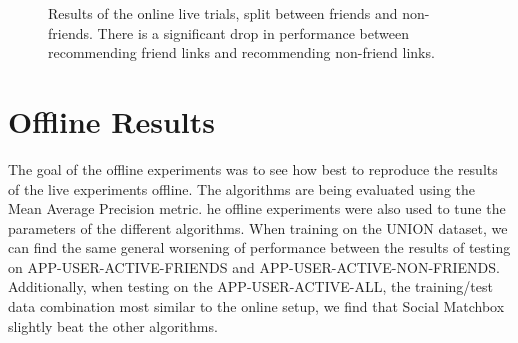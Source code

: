 \begin{figure}[h!]
\caption{Results of the online live trials, split between friends and non-friends. There is a significant drop in performance between recommending friend links and recommending non-friend links.}
\end{figure}

\section {Offline Results}

The goal of the offline experiments was to see how best to reproduce the results of the live experiments offline. The algorithms are being evaluated using the Mean Average Precision metric. he offline experiments were also used to tune the parameters of the different algorithms. When training on the UNION dataset, we can find the same general worsening of performance between the results of testing on APP-USER-ACTIVE-FRIENDS and APP-USER-ACTIVE-NON-FRIENDS. Additionally, when testing on the APP-USER-ACTIVE-ALL, the training/test data combination most similar to the online setup, we find that Social Matchbox slightly beat the other algorithms.


